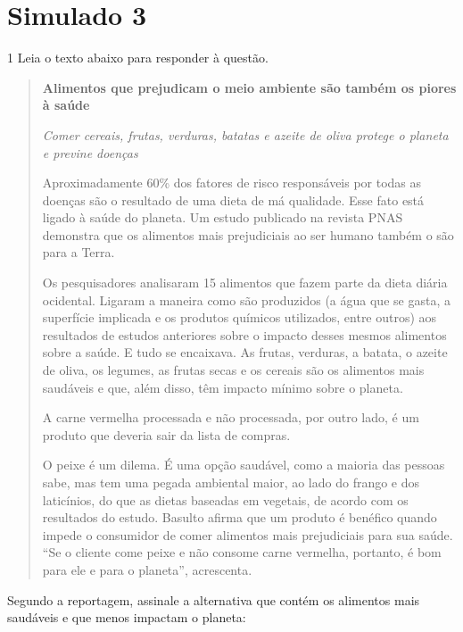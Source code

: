 \section*{Simulado 3}

\num{1} Leia o texto abaixo para responder à questão. 

\begin{quote}

\textbf{Alimentos que prejudicam o meio ambiente são também os piores à
saúde}

\textit{Comer cereais, frutas, verduras, batatas e azeite de oliva protege o
planeta e previne doenças}

Aproximadamente 60\% dos fatores de risco responsáveis por todas as
doenças são o resultado de uma dieta de má qualidade. Esse fato está
ligado à saúde do planeta. Um estudo publicado na revista PNAS demonstra
que os alimentos mais prejudiciais ao ser humano também o são para a
Terra.

Os pesquisadores analisaram 15 alimentos que fazem parte da dieta diária
ocidental. Ligaram a maneira como são produzidos (a água que se gasta, a
superfície implicada e os produtos químicos utilizados, entre outros)
aos resultados de estudos anteriores sobre o impacto desses mesmos
alimentos sobre a saúde. E tudo se encaixava. As frutas, verduras, a
batata, o azeite de oliva, os legumes, as frutas secas e os cereais são
os alimentos mais saudáveis e que, além disso, têm impacto mínimo sobre
o planeta.

A carne vermelha processada e não processada, por outro lado, é um
produto que deveria sair da lista de compras.

O peixe é um dilema. É uma opção saudável, como a maioria das pessoas
sabe, mas tem uma pegada ambiental maior, ao lado do frango e dos
laticínios, do que as dietas baseadas em vegetais, de acordo com os
resultados do estudo. Basulto afirma que um produto é benéfico quando
impede o consumidor de comer alimentos mais prejudiciais para sua saúde.
``Se o cliente come peixe e não consome carne vermelha, portanto, é bom
para ele e para o planeta'', acrescenta.


\end{quote}

Segundo a reportagem, assinale a alternativa que contém os alimentos
mais saudáveis e que menos impactam o planeta:

